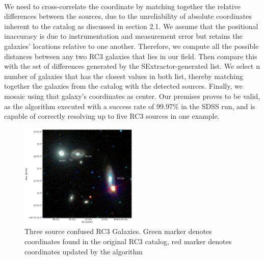 \documentclass[5p]{elsarticle}
\begin{document}
\\
\indent  We need to cross-correlate the coordinate by matching together the relative differences between the sources, due to the unreliability of absolute coordinates inherent to the catalog as discussed in section 2.1. We assume that the positional inaccuracy is due to  instrumentation and measurement error but retains the galaxies' locations relative to one another.  %
Therefore, we compute all the possible distances between any two RC3 galaxies that lies in our field. Then compare this with the set of differences generated by the SExtractor-generated list. We select n number of galaxies that has the closest values in both list, thereby matching together the galaxies from the catalog  with the detected sources. Finally, we mosaic using that galaxy's coordinates as center. Our premises proves to be valid, as the algorithm executed with a success rate of 99.97\% in the SDSS run, and is capable of correctly resolving up to five RC3 sources in one example.
		\begin{figure}[h]
		\includegraphics[width=0.5\textwidth]{figures/navigator}
		\caption{Three source confused RC3 Galaxies. Green marker denotes coordinates found in the original RC3 catalog, red marker denotes coordinates updated by the algorithm}
		\label{fig:positional_update_plot}
	\end{figure}
\end{document}
